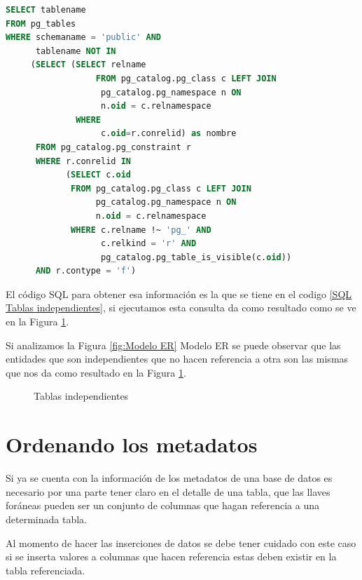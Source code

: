 \begin{lstlisting}[caption={Query para obtener tablas independientes},label={SQL Tablas independientes},language=sql]
SELECT tablename
FROM pg_tables
WHERE schemaname = 'public' AND
      tablename NOT IN
     (SELECT (SELECT relname 
      		      FROM pg_catalog.pg_class c LEFT JOIN
                   pg_catalog.pg_namespace n ON 
                   n.oid = c.relnamespace 
              WHERE
                   c.oid=r.conrelid) as nombre
      FROM pg_catalog.pg_constraint r 
      WHERE r.conrelid IN
            (SELECT c.oid
             FROM pg_catalog.pg_class c LEFT JOIN
                  pg_catalog.pg_namespace n ON 
                  n.oid = c.relnamespace 
             WHERE c.relname !~ 'pg_' AND 
                   c.relkind = 'r' AND 
                   pg_catalog.pg_table_is_visible(c.oid))
      AND r.contype = 'f')
\end{lstlisting}
El c\'odigo SQL para obtener esa informaci\'on es la que se tiene en el codigo \ref{SQL Tablas independientes}, si ejecutamos esta consulta da como resultado como se ve en la Figura \ref{fig:Tablas independientes}.

Si analizamos la Figura \ref{fig:Modelo ER} Modelo ER se puede observar que las entidades que son independientes que no hacen referencia a otra son las mismas que nos da como resultado en la Figura \ref{fig:Tablas independientes}.
\begin{figure}[H]
\centering
{}
\caption{Tablas independientes} \label{fig:Tablas independientes}
\end{figure}
\section{Ordenando los metadatos}
Si ya se cuenta con la informaci\'on de los metadatos de una base de datos es necesario por una parte tener claro en el detalle de una tabla, que las llaves for\'aneas pueden ser un conjunto de columnas que hagan referencia a una determinada tabla.

Al momento de hacer las inserciones de datos se debe tener cuidado con este caso si se inserta valores a columnas que hacen referencia estas deben existir en la tabla referenciada.

